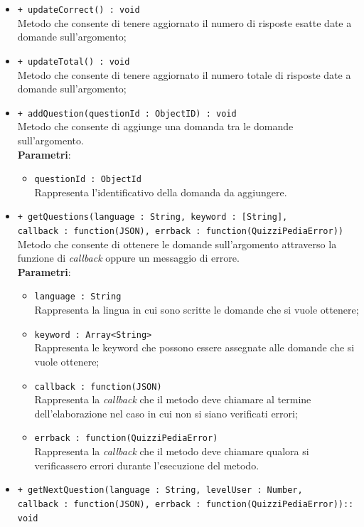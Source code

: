 \begin{itemize}
\begin{itemize}
			\item \texttt{+ updateCorrect() : void} \\
			Metodo che consente di tenere aggiornato il numero di risposte esatte date a domande sull'argomento;
			\item \texttt{+ updateTotal() : void} \\
			Metodo che consente di tenere aggiornato il numero totale di risposte date a domande sull'argomento;
			\item \texttt{+ addQuestion(questionId : ObjectID) : void} \\
			Metodo che consente di aggiunge una domanda tra le domande sull'argomento. \\
			\textbf{Parametri}:
			\begin{itemize}
			\item \texttt{questionId : ObjectId} \\
			Rappresenta l'identificativo della domanda da aggiungere.
			\end{itemize}
			\item \texttt{+ getQuestions(language : String, keyword : [String], \\callback : function(JSON), errback : function(QuizziPediaError))} \\
			Metodo che consente di ottenere le domande sull'argomento attraverso la funzione di \textit{callback} oppure un messaggio di errore. \\
			\textbf{Parametri}:
			\begin{itemize}
			\item \texttt{language : String} \\
			Rappresenta la lingua in cui sono scritte le domande che si vuole ottenere;
			\item \texttt{keyword : Array<String>} \\
			Rappresenta le keyword che possono essere assegnate alle domande che si vuole ottenere;
			\item \texttt{callback : function(JSON)} \\
			Rappresenta la \textit{callback} che il metodo deve chiamare al termine dell'elaborazione nel caso in cui non si siano verificati errori;
			\item \texttt{errback : function(QuizziPediaError)} \\
			Rappresenta la \textit{callback} che il metodo deve chiamare qualora si verificassero errori durante l'esecuzione del metodo.
			\end{itemize}
			\item \texttt{+ getNextQuestion(language : String, levelUser : Number, \\callback : function(JSON), errback : function(QuizziPediaError)):: void} \\

\end{itemize}
\end{itemize}
